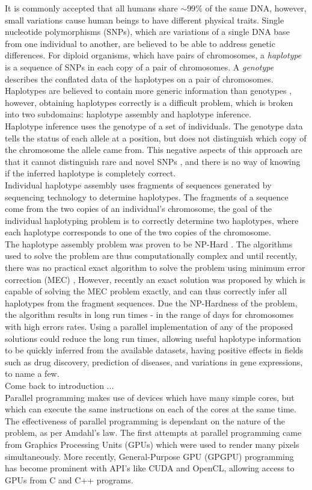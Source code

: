 \documentclass[10pt,twocolumn]{witseiepaper}
\begin{document}
It is commonly accepted that all humans share $\mathtt{\sim}$99$\%$ of the same DNA, however, small variations 
cause human beings to have different physical traits. Single nucleotide polymorphisms (SNPs), which are
variations of a single DNA base from one individual to another, are believed to be able to address
genetic differences. For diploid organisms, which have pairs of chromosomes, a \textit{haplotype} is a 
sequence of SNPs in each copy of a pair of chromosomes. A \textit{genotype} describes the conflated data of the
haplotypes on a pair of chromosomes. Haplotypes are believed to contain more generic information than
genotypes \cite{stephens:2001}, however, obtaining haplotypes correctly is a difficult problem, which is 
broken into two subdomains: haplotype assembly and haplotype inference. \\
Haplotype inference uses the genotype of a set of individuals. The genotype data tells the status of each
allele at a position, but does not distinguish which copy of the chromosome the allele came from.
This negative aspects of this approach are that it cannot distinguish rare and novel SNPs \cite{he:2010}, 
and there is no way of knowing if the inferred haplotype is completely correct. \\
Individual haplotype assembly uses fragments of sequences generated by sequencing technology to determine
haplotypes. The fragments of a sequence come from the two copies of an individual's chromosome, the goal of the
individual haplotyping problem is to correctly determine two haplotypes, where each haplotype corresponds to
one of the two copies of the chromosome. \\
The haplotype assembly problem was proven to be NP-Hard \cite{lippert:2002}. The algorithms used to solve the
problem are thus computationally complex and until recently, there was no practical exact algorithm to solve 
the problem using minimum error correction (MEC) \cite{bonizzoni:2003},
However, recently an exact solution was proposed by \cite{chen:2013} which is capable of solving the MEC 
problem exactly, and can thus correctly infer all haplotypes from the fragment sequences. Due the NP-Hardness 
of the problem, the algorithm results in long run times - in the range of days for chromosomes with high
errors rates. Using a parallel implementation of any of the proposed solutions could reduce the long run
times, allowing useful haplotype information to be quickly inferred from the available datasets, having
positive effects in fields such as drug discovery, prediction of diseases, and variations in gene
expressions, to name a few. \\
Come back to introduction ... \\
Parallel programming makes use of devices which have many simple cores, but which can execute the same
instructions on each of the cores at the same time. The effectiveness of parallel programming is dependant on
the nature of the problem, as per Amdahl's law. The first attempts at parallel programming came from Graphics
Processing Units (GPUs) which were used to render many pixels simultaneously. More recently, General-Purpose
GPU (GPGPU) programming has become prominent with API's like CUDA and OpenCL, allowing access to GPUs from C and
C++ programs. 
\end{document}
